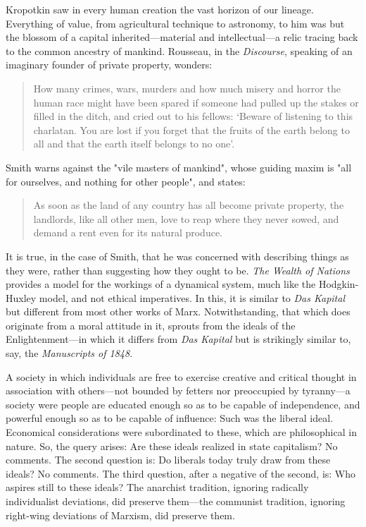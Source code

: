 \documentclass[a4paper]{article}
\begin{document}
Kropotkin saw in every human creation the vast horizon of our lineage.
Everything of value, from agricultural technique to astronomy, to him was but
the blossom of a capital inherited---material and intellectual---a relic
tracing back to the common ancestry of mankind. Rousseau, in the
\textit{Discourse}, speaking of an imaginary founder of private property,
wonders:

\begin{quote}
    How many crimes, wars, murders and how much misery and horror the human
    race might have been spared if someone had pulled up the stakes or filled
    in the ditch, and cried out to his fellows: ‘Beware of listening to this
    charlatan. You are lost if you forget that the fruits of the earth belong
    to all and that the earth itself belongs to no one’.
\end{quote}

Smith warns against  the "vile masters of mankind", whose guiding maxim is "all
for ourselves, and nothing for other people", and states:

\begin{quote}
    As soon as the land of any country has all become private property, the
    landlords, like all other men, love to reap where they never sowed, and
    demand a rent even for its natural produce.
\end{quote}

It is true, in the case of Smith, that he was concerned with describing things
as they were, rather than suggesting how they ought to be. \textit{The Wealth
of Nations} provides a model for the workings of a dynamical system, much like
the Hodgkin-Huxley model, and not ethical imperatives. In this, it is similar
to \textit{Das Kapital} but different from most other works of Marx.
Notwithstanding, that which does originate from a moral attitude in it, sprouts
from the ideals of the Enlightenment---in which it differs from \textit{Das
Kapital} but is strikingly similar to, say, the \textit{Manuscripts of 1848}.

A society in which individuals are free to exercise creative and critical
thought in association with others---not bounded by fetters nor preoccupied by
tyranny---a society were people are educated enough so as to be capable of
independence, and powerful enough so as to be capable of influence: Such was
the liberal ideal. Economical considerations were subordinated to these, which
are philosophical in nature. So, the query arises: Are these ideals realized in
state capitalism? No comments. The second question is: Do liberals today truly
draw from these ideals? No comments. The third question, after a negative of
the second, is: Who aspires still to these ideals? The anarchist tradition,
ignoring radically individualist deviations, did preserve them---the communist
tradition, ignoring right-wing deviations of Marxism, did preserve them.
\end{document}
